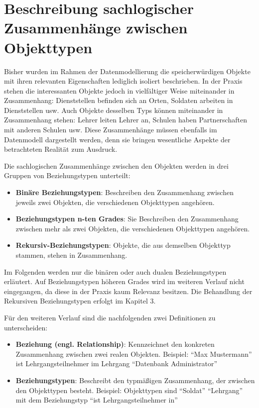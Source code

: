   \chapter{Beschreibung sachlogischer Zusammenh\"ange zwischen Objekttypen}
    \setcounter{page}{1}
    \minitoc
\newpage
    Bisher wurden im Rahmen der Datenmodellierung die speicherw\"urdigen Objekte mit ihren relevanten Eigenschaften lediglich isoliert beschrieben. In der Praxis stehen die interessanten Objekte jedoch in vielf\"altiger Weise miteinander in Zusammenhang: Dienststellen befinden sich an Orten, Soldaten arbeiten in Dienststellen usw. Auch Objekte desselben Typs k\"onnen miteinander in Zusammenhang stehen: Lehrer leiten Lehrer an, Schulen haben Partnerschaften mit anderen Schulen usw. Diese Zusammenh\"ange m\"ussen ebenfalls im Datenmodell dargestellt werden, denn sie bringen wesentliche Aspekte der betrachteten Realit\"at zum Ausdruck.

    Die sachlogischen Zusammenh\"ange zwischen den Objekten werden in drei Gruppen von Beziehungstypen unterteilt:
    \begin{itemize}
      \item \textbf{Bin\"are Beziehungstypen}: Beschreiben den Zusammenhang zwischen jeweils zwei Objekten, die verschiedenen Objekttypen angeh\"oren.
      \item \textbf{Beziehungstypen n-ten Grades}: Sie Beschreiben den Zusammenhang zwischen mehr als zwei Objekten, die verschiedenen Objekttypen angeh\"oren.
      \item \textbf{Rekursiv-Beziehungstypen}: Objekte, die aus demselben Objekttyp stammen, stehen in Zusammenhang.
    \end{itemize}

    Im Folgenden werden nur die bin\"aren oder auch dualen Beziehungstypen erl\"autert. Auf Beziehungstypen h\"oheren Grades wird im
    weiteren Verlauf nicht eingegangen, da diese in der Praxis kaum Relevanz besitzen. Die Behandlung der Rekursiven
    Beziehungstypen erfolgt im Kapitel 3.

      F\"ur den weiteren Verlauf sind die nachfolgenden zwei Definitionen zu unterscheiden:
      \begin{itemize}
        \item \textbf{Beziehung (engl. Relationship)}: Kennzeichnet den konkreten Zusammenhang zwischen zwei realen Objekten. Beispiel: \enquote{Max Mustermann} ist Lehrgangsteilnehmer im Lehrgang \enquote{Datenbank Administrator}
        \item \textbf{Beziehungstypen}: Beschreibt den typm\"a\ss igen Zusammenhang, der zwischen den Objekttypen besteht. Beispiel: Objekttypen sind \enquote{Soldat} \enquote{Lehrgang} mit dem Beziehungstyp \enquote{ist Lehrgangsteilnehmer in}
      \end{itemize}

